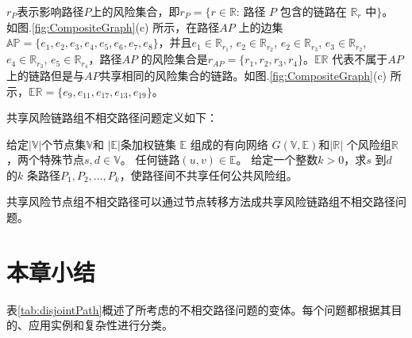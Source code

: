 $r_P$表示影响路径$P$上的风险集合，即$r_P=\{r\in \mathbb{R}$: 路径 $P$ 包含的链路在 $\mathbb{R}_r$ 中$\}$。 如图.\ref{fig:CompositeGraph}(c) 所示，在路径$AP$ 上的边集$\mathbb{AP}=\{e_1,e_2,e_3,e_4,e_5,e_6,e_7,e_8\}$，并且$e_1\in \mathbb{R}_{r_1}$, $e_2\in \mathbb{R}_{r_2}$, $e_2\in \mathbb{R}_{r_3}$, $e_3\in \mathbb{R}_{r_2}$, $e_4\in \mathbb{R}_{r_3}$, $e_5\in \mathbb{R}_{r_4}$，路径$AP$ 的风险集合是${r}_{{AP}}=\{r_1, r_2, r_3, r_4\}$。$\mathbb{\mathbb{ER}}$ 代表不属于$AP$上的链路但是与$AP$共享相同的风险集合的链路。如图.\ref{fig:CompositeGraph}(c) 所示，$\mathbb{\mathbb{ER}}=\{e_9,e_{11},e_{17},e_{13},e_{19}\}$。


共享风险链路组不相交路径问题定义如下：

\begin{definition}[共享风险链路组不相交路径问题]
给定$|\mathbb{V}|$个节点集$\mathbb{V}$和 $|\mathbb{E}|$条加权链集 $\mathbb{E}$ 组成的有向网络 $G(\mathbb{V},\mathbb{E})$和$|\mathbb{R}|$ 个风险组$\mathbb{R}$，两个特殊节点$s,d\in\mathbb{V}$。 任何链路$(u,v)\in\mathbb{E}$。 给定一个整数$k>0$，求$s$ 到$d$ 的$k$ 条路径$P_1,P_2,\ldots,P_k$，使路径间不共享任何公共风险组。
\end{definition}

共享风险节点组不相交路径可以通过节点转移方法成共享风险链路组不相交路径问题。

\section{本章小结}
表\ref{tab:disjointPath}概述了所考虑的不相交路径问题的变体。每个问题都根据其目的、应用实例和复杂性进行分类。

